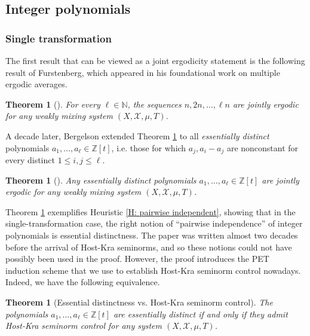 \documentclass[11pt]{amsart}
\newtheorem{theorem}[lemma]{Theorem}
\theoremstyle{definition}
\newcommand{\N}{{\mathbb N}}
\newcommand{\Z}{{\mathbb Z}}
\newcommand{\CX}{{\mathcal X}}
\newcommand{\1}{{\mathbf{1}}}
\begin{document}
\subsection{Integer polynomials}
\subsubsection{Single transformation}
The first result that can be viewed as a joint ergodicity statement is the following result of Furstenberg, which appeared in his foundational work on multiple ergodic averages.
\begin{theorem}%
[{\cite{Fu77}}]\label{T: Furstenberg averages weakly mixing}
    For every $\ell\in\N$, the sequences $n, 2n, \ldots, \ell n$ are jointly ergodic for any weakly mixing system $(X, \CX, \mu, T)$.
\end{theorem}
A decade later, Bergelson extended Theorem \ref{T: Furstenberg averages weakly mixing} to all \emph{essentially distinct} polynomials $a_1, \ldots, a_\ell\in\Z[t]$, i.e. those for which $a_j, a_i -a_j$ are nonconstant for every distinct $1\leq i,j\leq \ell$.
\begin{theorem}%
[{\cite{Ber87}}]\label{T: Bergelson weakly mixing}
    Any essentially distinct polynomials $a_1, \ldots, a_\ell\in\Z[t]$ are jointly ergodic for any weakly mixing system $(X, \CX, \mu, T)$.
\end{theorem}
Theorem \ref{T: Bergelson weakly mixing} exemplifies Heuristic \ref{H: pairwise independent}, showing that in the single-transformation case, the right notion of ``pairwise independence'' of integer polynomials is essential distinctness. The paper \cite{Ber87} was written almost two decades before the arrival of Host-Kra seminorms, and so these notions could not have possibly been used in the proof. However, the proof introduces the PET induction scheme that we use to establish Host-Kra seminorm control nowadays. Indeed, we have the following equivalence.
\begin{theorem}[Essential distinctness vs. Host-Kra seminorm control]\label{T: HK seminorm control for polys and single trafo}
    The polynomials $a_1, \ldots, a_\ell\in\Z[t]$ are essentially distinct if and only if they admit Host-Kra seminorm control for any system $(X, \CX, \mu, T)$.
\end{theorem}
\end{document}
